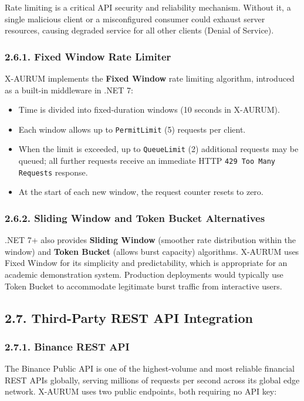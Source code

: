 Rate limiting is a critical API security and reliability mechanism. Without it, a single malicious client or a misconfigured consumer could exhaust server resources, causing degraded service for all other clients (Denial of Service).

\subsubsection{2.6.1. Fixed Window Rate Limiter}
X-AURUM implements the \textbf{Fixed Window} rate limiting algorithm, introduced as a built-in middleware in .NET 7:

\begin{itemize}
  \item Time is divided into fixed-duration windows (10 seconds in X-AURUM).
  \item Each window allows up to \texttt{PermitLimit} (5) requests per client.
  \item When the limit is exceeded, up to \texttt{QueueLimit} (2) additional requests may be queued; all further requests receive an immediate HTTP \texttt{429 Too Many Requests} response.
  \item At the start of each new window, the request counter resets to zero.
\end{itemize}

\subsubsection{2.6.2. Sliding Window and Token Bucket Alternatives}
.NET 7+ also provides \textbf{Sliding Window} (smoother rate distribution within the window) and \textbf{Token Bucket} (allows burst capacity) algorithms. X-AURUM uses Fixed Window for its simplicity and predictability, which is appropriate for an academic demonstration system. Production deployments would typically use Token Bucket to accommodate legitimate burst traffic from interactive users.

\subsection{2.7. Third-Party REST API Integration}

\subsubsection{2.7.1. Binance REST API}
The Binance Public API is one of the highest-volume and most reliable financial REST APIs globally, serving millions of requests per second across its global edge network. X-AURUM uses two public endpoints, both requiring no API key:

